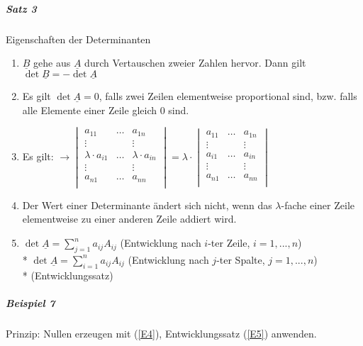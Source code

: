 \documentclass[a4paper]{scrartcl}
\begin{document}
\subparagraph{Satz 3} Eigenschaften der Determinanten
\begin{enumerate}
\item $\underline{B}$ gehe aus $\underline{A}$ durch Vertauschen zweier Zahlen hervor. Dann gilt $\det{\underline{B}} = - \det{\underline{A}}$
\item Es gilt $\det{\underline{A}} = 0$, falls zwei Zeilen elementweise proportional sind, bzw. falls alle Elemente einer Zeile gleich $0$ sind.
\item Es gilt:
$\rightarrow \begin{vmatrix}
a_{11} & \dots & a_{1n}\\
\vdots &  & \vdots\\
\lambda \cdot a_{i1} & \dots & \lambda \cdot a_{in}\\
\vdots & & \vdots\\
a_{n1} & \dots & a_{nn}\\
\end{vmatrix} =  \lambda \cdot \begin{vmatrix}
a_{11} & \dots & a_{1n}\\
\vdots & & \vdots\\
a_{i1} &\dots & a_{in}\\
\vdots & & \vdots\\
a_{n1} & \dots & a_{nn}\\
\end{vmatrix}$
\item \label{E4}Der Wert einer Determinante ändert sich nicht, wenn das $\lambda$-fache einer Zeile elementweise zu einer anderen Zeile addiert wird.
\item \label{E5} $\det{\underline{A}} = \sum\limits_{j=1}^{n} a_{ij} A_{ij}$ (Entwicklung nach $i$-ter Zeile, $i=1,...,n$)\\*
$\det{\underline{A}} = \sum\limits_{i=1}^{n} a_{ij} A_{ij}$ (Entwicklung nach $j$-ter Spalte, $j=1,...,n$)\\*
(Entwicklungssatz)
\end{enumerate}

\subparagraph{Beispiel 7} Prinzip: Nullen erzeugen mit (\ref{E4}), Entwicklungssatz  (\ref{E5}) anwenden.
\end{document}
